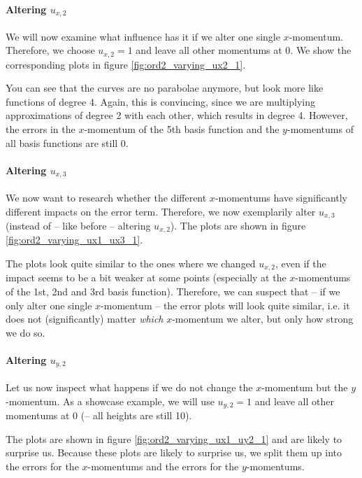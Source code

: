 \documentclass{article}
\begin{document}
\paragraph{Altering $u_{x,2}$}

We will now examine what influence has it if we alter one single $x$-momentum. Therefore, we choose $u_{x,2}=1$ and leave all other momentums at 0. We show the corresponding plots in figure \ref{fig:ord2_varying_ux2_1}.



You can see that the curves are no parabolae anymore, but look more like functions of degree 4. Again, this is convincing, since we are multiplying approximations of degree 2 with each other, which results in degree 4. However, the errors in the $x$-momentum of the 5th basis function and the $y$-momentums of all basis functions are still 0.

\paragraph{Altering $u_{x,3}$}

We now want to research whether the different $x$-momentums have significantly different impacts on the error term. Therefore, we now exemplarily alter $u_{x,3}$ (instead of -- like before -- altering $u_{x,2}$). The plots are shown in figure \ref{fig:ord2_varying_ux1_ux3_1}.



The plots look quite similar to the ones where we changed $u_{x,2}$, even if the impact seems to be a bit weaker at some points (especially at the $x$-momentums of the 1st, 2nd and 3rd basis function). Therefore, we can suspect that -- if we only alter one single $x$-momentum -- the error plots will look quite similar, i.e. it does not (significantly) matter \emph{which} $x$-momentum we alter, but only how strong we do so.

\paragraph{Altering $u_{y,2}$}

Let us now inspect what happens if we do not change the $x$-momentum but the $y$-momentum. As a showcase example, we will use $u_{y,2}=1$ and leave all other momentums at 0 (-- all heights are still 10). 

The plots are shown in figure \ref{fig:ord2_varying_ux1_uy2_1} and are likely to surprise us. Because these plots are likely to surprise us, we split them up into the errors for the $x$-momentums and the errors for the $y$-momentums.
\end{document}
